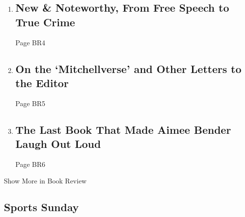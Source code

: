 \begin{enumerate}
\def\labelenumi{\arabic{enumi}.}
\item
  \href{/2020/07/21/books/review/new-this-week.html}{}

  \hypertarget{new--noteworthy-from-free-speech-to-true-crime}{%
  \subsection{New \& Noteworthy, From Free Speech to True
  Crime}\label{new--noteworthy-from-free-speech-to-true-crime}}

  Page BR4
\item
  \href{/2020/07/24/books/review/on-the-mitchellverse-and-other-letters-to-the-editor.html}{}

  \hypertarget{on-the-mitchellverse-and-other-letters-to-the-editor}{%
  \subsection{On the `Mitchellverse' and Other Letters to the
  Editor}\label{on-the-mitchellverse-and-other-letters-to-the-editor}}

  Page BR5
\item
  \href{/2020/07/23/books/review/aimee-bender-by-the-book-interview.html}{}

  \hypertarget{the-last-book-that-made-aimee-bender-laugh-out-loud}{%
  \subsection{The Last Book That Made Aimee Bender Laugh Out
  Loud}\label{the-last-book-that-made-aimee-bender-laugh-out-loud}}

  Page BR6
\end{enumerate}

Show More in Book Review

\hypertarget{sports-sunday}{%
\subsection{Sports Sunday}\label{sports-sunday}}

